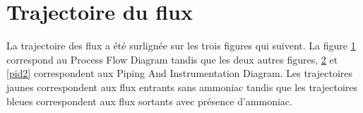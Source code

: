 \newpage
\section{Trajectoire du flux}
\label{sec:trajectoire}
La trajectoire des flux a été surlignée sur les trois figures
qui suivent. La figure \ref{pdf1} correspond au Process Flow Diagram
tandis que les deux autres figures, \ref{pid1} et \ref{pid2} 
correspondent aux Piping And Instrumentation Diagram.
Les trajectoires jaunes correspondent aux flux entrants sans ammoniac
tandis que les trajectoires bleues correspondent aux flux sortants
avec présence d'ammoniac.

\begin{figure}[htb!]
	\centering
	\label{pdf1}
\end{figure}
\newpage

\begin{figure}[htb!]
	\centering
	\label{pid1}
\end{figure}
\newpage

